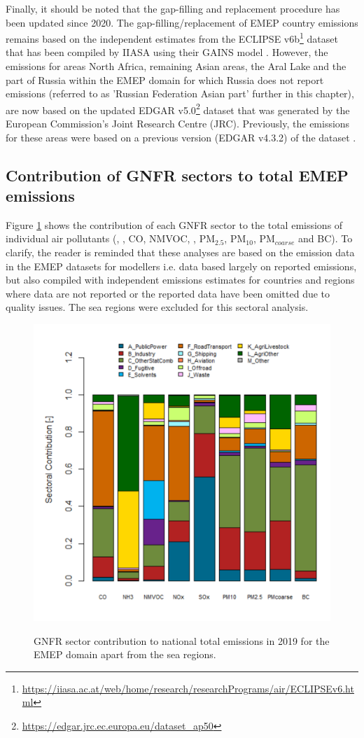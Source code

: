 Finally, it should be noted that the gap-filling and replacement procedure has been updated since 2020. The gap-filling/replacement of EMEP country emissions remains based on the independent estimates from the ECLIPSE v6b\footnote{\url{https://iiasa.ac.at/web/home/research/researchPrograms/air/ECLIPSEv6.html}} dataset that has been compiled by IIASA using their GAINS model \citep{Amann_et_al:2011}. However, the emissions for areas North Africa, remaining Asian areas, the Aral Lake and the part of Russia within the EMEP domain for which Russia does not report emissions (referred to as 'Russian Federation Asian part' further in this chapter), are now based on the updated EDGAR v5.0\footnote{\url{https://edgar.jrc.ec.europa.eu/dataset_ap50}}  dataset \citep{EDGARv50} that was generated by the European Commission's Joint Research Centre (JRC). Previously, the emissions for these areas were based on a previous version (EDGAR v4.3.2) of the dataset \citep{EDGARv432}.


\subsection{Contribution of GNFR sectors to total EMEP emissions}
\label{sec:GNFRsec}

Figure \ref{fig:CEIP6} shows the contribution of each GNFR sector to the
total emissions of individual air pollutants (\sox, \nox, CO, NMVOC,
\nhiii, PM$_{2.5}$, PM$_{10}$, PM$_{coarse}$ and BC).
To clarify, the reader is reminded that these analyses are based on the emission data in the EMEP datasets for modellers i.e. data based largely on reported emissions, but also compiled with independent emissions estimates for countries and regions where data are not reported or the reported data have been omitted due to quality issues. The sea regions were excluded for this sectoral analysis.


\begin{figure}[h]
\centering
{\includegraphics*[viewport=1 1 565 565,clip,width=0.65\linewidth]{FIGS_CEIP/Fig6.pdf}}
\caption{GNFR sector contribution to national total emissions in 2019
  for the EMEP domain apart from the  sea regions.}
\label{fig:CEIP6}
\end{figure}

